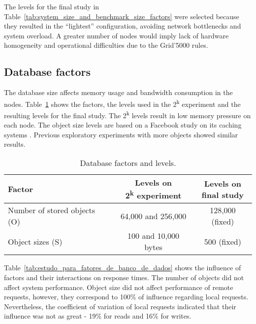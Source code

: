 \documentclass[man,floatsintext,12pt]{apa6}
\begin{document}
The levels for the final study in
Table~\ref{tab:system_size_and_benchmark_size_factors} were selected because
they resulted in the ``lightest'' configuration, avoiding network bottlenecks
and system overload. A greater number of nodes would imply lack of hardware
homogeneity and operational difficulties due to the Grid'5000 rules.

\subsection{Database factors}

The database size affects memory usage and bandwidth consumption in the nodes.
Table~\ref{tab:database_factors_and_levels} shows the factors, the levels used
in the 2\textsuperscript{k} experiment and the resulting levels for the final
study. The 2\textsuperscript{k} levels result in low memory pressure on each
node. The object size levels are based on a Facebook study on its caching
systems \parencite{Atikoglu2012}.  Previous exploratory experiments with more
objects showed similar results.

\begin{table}[h!]
\caption{Database factors and levels.}
\label{tab:database_factors_and_levels}
\begin{tabular}{lcc} \toprule
Factor & \thead{Levels on \\ 2\textsuperscript{k} experiment} & \thead{Levels on \\final study} \\ \midrule

Number of stored objects (O) & 64,000 and 256,000 & 128,000 (fixed)\\

Object sizes (S) & 100 and 10,000 bytes & 500 (fixed)\\ \bottomrule

\end{tabular}  
\end{table}

Table~\ref{tab:estudo_para_fatores_de_banco_de_dados} shows the influence of
factors and their interactions on response times. The number of objects did not
affect system performance. Object size did not affect performance of remote
requests, however, they correspond to 100\% of influence regarding local
requests. Nevertheless, the coefficient of variation of local requests
indicated that their influence was not as great - 19\% for reads and 16\% for
writes.
\end{document}

